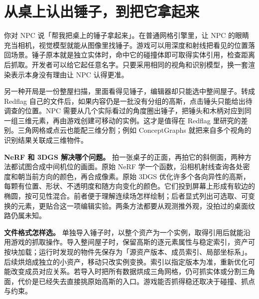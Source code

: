 \documentclass[UTF8,11pt,fontset=fandol,a4paper]{ctexart}
\begin{document}
\section{从桌上认出锤子，到把它拿起来}
你对 NPC 说「帮我把桌上的锤子拿起来」。在普通网格引擎里，让 NPC 的眼睛充当相机，视觉模型就能从图像里找锤子。游戏可以用深度和射线把看见的位置落回场景。锤子原本就是独立实体时，命中它的碰撞体即可取得实体引用，检查距离后抓取。开发者可以给它起任意名字。只要采用相同的视角和识别模型，换一套渲染表示本身没有理由让 NPC 认得更准。

另一种开局是一份整屋扫描，里面看得见锤子，编辑器却只能选中整间屋子。转成 Redflag 自己的文件后，如果内容仍是一批没有分组的高斯，点击锤头只能给出待调查的位置。NPC 需要从几个实际看过的角度圈出锤子，把锤头和木柄对应到同一组三维元素，再由游戏创建可移动的实例。这才是值得在 Redflag 里研究的差别。三角网格或点云也能配三维分割；例如 ConceptGraphs 就把来自多个视角的识别结果关联成三维物件。

\textbf{NeRF 和 3DGS 解决哪个问题。} 拍一张桌子的正面，再拍它的斜侧面，两种方法都试图合成中间机位的画面。原始 NeRF 学一个函数，沿相机射线查询各处密度和朝当前方向的颜色，再合成像素。原始 3DGS 优化许多个各向异性的高斯，每颗有位置、形状、不透明度和随方向变化的颜色。它们投到屏幕上形成有软边的椭圆，按可见性混合。前者便于理解连续场怎样绘制；后者显式列出可选取、可变换的元素，更贴合这一项编辑实验。两条方法都要从观测推外观，没拍过的桌面纹路仍属未知。\quad{}

\textbf{文件格式怎样选。} 单独导入锤子时，以整个资产为一个实例，取得引用后就能沿用游戏的抓取操作。导入整间屋子时，保留高斯的逐元素属性与稳定索引，资产可按块加载；运行时发现的物件先保存为「源资产版本、成员索引、局部坐标系」。后续烘焙成独立的小资产，移动只改实例变换。索引以指定版本为准，重新优化可能改变成员对应关系。若导入时把所有数据烘成三角网格，仍可抓实体或分割三角面，代价是已经失去直接挑原始高斯的入口。游戏能否抓得稳还取决于碰撞、抓点与约束。
\end{document}
